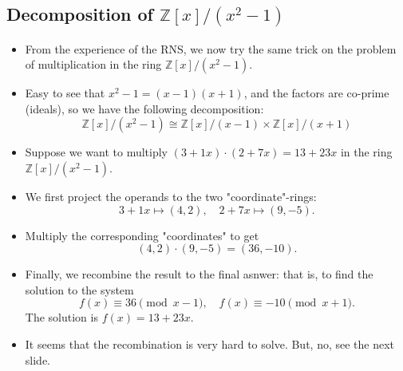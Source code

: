 \subsection{Decomposition of \( \mathbb{Z}[x]/(x^2-1) \)}
\begin{frame}
\begin{itemize}
    \item <1->From the experience of the RNS, we now try the same trick on the problem of 
          multiplication in the ring \( \mathbb{Z}[x]/(x^2 - 1) \).
    \item <2->Easy to see that \(x^2 - 1 = (x - 1)(x + 1)\), 
          and the factors are co-prime (ideals),
          so we have the following decomposition:
          \[ \mathbb{Z}[x]/(x^2 - 1) \cong 
             \mathbb{Z}[x]/(x - 1) \times 
             \mathbb{Z}[x]/(x + 1) \]
    \item <3->Suppose we want to multiply \( (3 + 1x) \cdot (2 + 7x) = 13 + 23x\) in the ring 
          \( \mathbb{Z}[x]/(x^2 - 1) \).
    \item <4->We first project the operands to the two "coordinate"-rings:
          \[
            3+1x \mapsto (4,2),\quad 2+7x \mapsto (9,-5).
          \]
    \item <5->Multiply the corresponding "coordinates" to get
        \[
            (4,2)\cdot (9,-5) = (36,-10).
        \]
    \item <6->Finally, we recombine the result to the final asnwer: 
          that is, to find the solution to the system
          \[
            f(x) \equiv 36 \pmod{x-1},\quad 
            f(x) \equiv -10 \pmod{x+1}.
          \]
          The solution is \(f(x) = 13 + 23 x\).
        \item <7->It seems that the recombination is very hard to solve. But, no, see the next slide.
  \end{itemize}
\end{frame}

